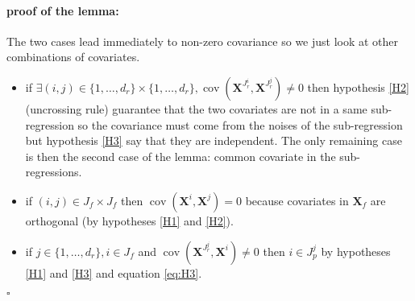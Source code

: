 \documentclass[11pt,a4paper]{article}
\begin{document}
\paragraph{proof of the lemma:}
The two cases lead immediately to non-zero covariance so we just look at other combinations of covariates.
\begin{itemize}
	\item if $\exists (i,j)\in \{1,\dots,d_r\}\times \{1,\dots,d_r\}, \operatorname{cov}(\boldsymbol{X}^{J_r^i},\boldsymbol{X}^{J_r^j})\neq 0$ then hypothesis \ref{H2} (uncrossing rule) guarantee that the two covariates are not in a same sub-regression so the covariance must come from the noises of the sub-regression but hypothesis \ref{H3} say that they are independent. The only remaining case is then the second case of the lemma: common covariate in the sub-regressions.
	\item if $(i,j)\in J_f\times J_f$ then  $\operatorname{cov}(\boldsymbol{X}^i,\boldsymbol{X}^j)=0 $ because covariates in $\boldsymbol{X}_f$ are orthogonal (by hypotheses \ref{H1} and \ref{H2}).
	\item if $j \in \{1,\dots,d_r\}, i \in J_f$ and $\operatorname{cov}(\boldsymbol{X}^{J_r^j},\boldsymbol{X}^i)\neq 0$ then $i\in J_p^j$ by hypotheses \ref{H1} and \ref{H3} and equation \ref{eq:H3}.
\end{itemize}
$\square$
\end{document}
